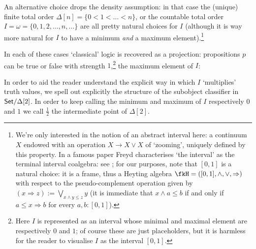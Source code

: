 An alternative choice drops the density assumption: in that case the (unique) finite total order $\Delta[n] = \{0 < 1 <\dots < n\}$, or the countable total order $I=\omega = \{0,1,2,\dots,n,\dots\}$ are all pretty natural choices for $I$ (although it is way more natural for $I$ to have a minimum \emph{and} a maximum element).\footnote{We're only interested in the notion of an abstract interval here: a continuum $X$ endowed with an operation $X \to X \vee X$ of `zooming', uniquely defined by this property. In a famous paper Freyd characterises `the interval' as the terminal interval coalgebra: see \cite[§1]{freyd2008algebraic}; for our purposes, note that $[0,1]$ is a natural choice: it is a frame, thus a Heyting algebra $\fkH =([0,1],\land,\lor,\Rightarrow)$ with respect to the pseudo-complement operation given by $(x \Rightarrow z) := \bigvee_{x\land y \le z} y$ (it is immediate that $x \land a \le b$ if and only if $a \le x \Rightarrow b$ for every $a,b: [0,1]$).}
\begin{remark}\label{fig_Omega}
	In each of these cases `classical' logic is recovered as a projection: propositions $p$ can be true or false with strength $1$,\footnote{Here $I$ is represented as an interval whose minimal and maximal element are respectively $0$ and $1$; of course these are just placeholders, but it is harmless for the reader to visualise $I$ as the interval $[0,1]$.} the maximum element of $I$:
	\begin{center}
	\end{center}
\end{remark}
In order to aid the reader understand the explicit way in which $I$ `multiplies' truth values, we spell out explicitly the structure of the subobject classifier in $\mathsf{Set}/\Delta[2]$. In order to keep calling the minimum and maximum of $I$ respectively $0$ and $1$ we call $\frac{1}{2}$ the intermediate point of $\Delta[2]$.
